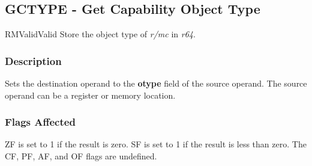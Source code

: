 \clearpage
{}
{}
\subsection*{GCTYPE - Get Capability Object Type}

\begin{x86opcodetable}
  {RM}{Valid}{Valid}
  {Store the object type of \emph{r/mc} in \emph{r64}.}
\end{x86opcodetable}

\begin{x86opentable}
\end{x86opentable}

\subsubsection*{Description}

Sets the destination operand to the \textbf{otype} field of the source
operand.  The source operand can be a register or memory location.

\subsubsection*{Flags Affected}

ZF is set to 1 if the result is zero.  SF is set to 1 if the result is
less than zero. The CF, PF, AF, and OF flags are undefined.
